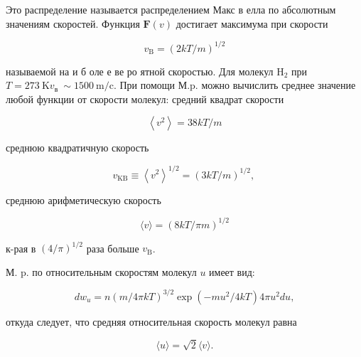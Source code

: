 \documentclass[10pt]{article}
\begin{document}
Это распределение называется распределением Макс в елла по абсолютным значениям скоростей. Функция $\boldsymbol{F}(v)$ достигает максимума при скорости



\[

v_{\mathrm{B}}=(2 k T / m)^{1 / 2}

\]



называемой на и б оле е ве ро ятной скоростью. Для молекул $\mathrm{H}_{2}$ при $T=273 \mathrm{~K} v_{\text {в }} \sim 1500 \mathrm{~m} / \mathrm{c}$. При помощи М.p. можно вычислить среднее значение любой функции от скорости молекул: средний квадрат скорости



\[

\left\langle v^{2}\right\rangle=38 k T / m

\]



среднюю квадратичную скорость



\[

v_{\mathrm{KB}} \equiv\left\langle v^{2}\right\rangle^{1 / 2}=(3 k T / m)^{1 / 2} \text {, }

\]



среднюю арифметическую скорость



\[

\langle v\rangle=(8 k T / \pi m)^{1 / 2}

\]



к-рая в $(4 / \pi)^{1 / 2}$ раза больше $v_{\mathrm{B}}$.



М. p. по относительным скоростям молекул $u$ имеет вид:



\[

d w_{u}=n(m / 4 \pi k T)^{3 / 2} \exp \left(-m u^{2} / 4 k T\right) 4 \pi u^{2} d u,

\]



откуда следует, что средняя относительная скорость молекул равна



\[

\langle u\rangle=\sqrt{2}\langle v\rangle .

\]
\end{document}
